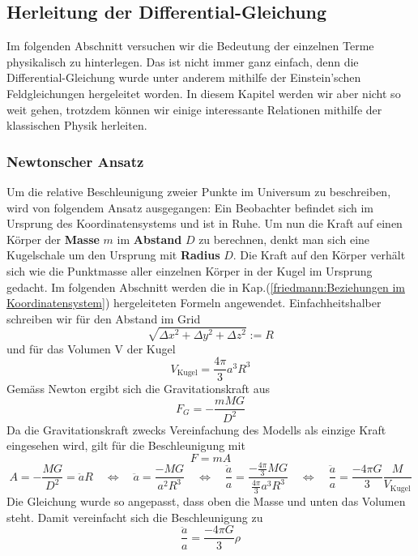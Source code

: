 \begin{refsection}
\subsection{Herleitung der Differential-Gleichung}
Im folgenden Abschnitt versuchen wir die Bedeutung der einzelnen Terme physikalisch zu hinterlegen. Das ist nicht immer ganz einfach, denn die Differential-Gleichung wurde unter anderem mithilfe der Einstein'schen Feldgleichungen hergeleitet worden. In diesem Kapitel werden wir aber nicht so weit gehen, trotzdem können wir einige interessante Relationen mithilfe der klassischen Physik herleiten.
\subsubsection{Newtonscher Ansatz}
Um die relative Beschleunigung zweier Punkte im Universum zu beschreiben, wird von folgendem Ansatz ausgegangen: Ein Beobachter befindet sich im Ursprung des Koordinatensystems und ist in Ruhe. Um nun die Kraft auf einen Körper der \textbf{Masse} $m$ im \textbf{Abstand} $D$ zu berechnen, denkt man sich eine Kugelschale um den Ursprung mit \textbf{Radius} $D$. Die Kraft auf den Körper verhält sich wie die Punktmasse aller  einzelnen Körper in der Kugel im Ursprung gedacht.
Im folgenden Abschnitt werden die in Kap.(\ref{friedmann:Beziehungen im Koordinatensystem}) hergeleiteten Formeln angewendet. Einfachheitshalber schreiben wir für den Abstand im Grid
\[ \sqrt{\Delta x^2 + \Delta y^2 + \Delta z^2} := R \]
und für das Volumen V der Kugel
\[V_\text{Kugel} = \frac{4 \pi }{3} a^3 R^3\]
Gemäss Newton ergibt sich die Gravitationskraft aus
\begin{equation}
F_G = -\frac{m M G}{D^2}
\end{equation}
Da die Gravitationskraft zwecks Vereinfachung des Modells als einzige Kraft eingesehen wird, gilt für die Beschleunigung mit 
\[F = m A\]
\[A = - \frac{M G}{D^2} = \ddot{a} R \quad\Leftrightarrow\quad \ddot{a} = \frac{- M G}{a^2 R^3} \quad\Leftrightarrow\quad \frac{\ddot{a}}{a} = \frac{-\frac{4 \pi }{3} M G}{\frac{4 \pi}{3}a^3 R^3} \quad\Leftrightarrow\quad \frac{\ddot{a}}{a} = \frac{- 4 \pi G}{3} \frac{M}{V_\text{Kugel}}\]
Die Gleichung wurde so angepasst, dass oben die Masse und unten das Volumen steht. Damit vereinfacht sich die Beschleunigung zu
\begin{equation}
\frac{\ddot{a}}{a} = \frac{- 4 \pi G}{3} \rho
\end{equation}

\end{refsection}
